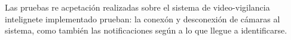 Las pruebas re acpetación realizadas sobre el sistema de video-vigilancia intelignete implementado prueban: la conexón y desconexión de cámaras al sistema, como también las notificaciones según a lo que llegue a identificarse.

